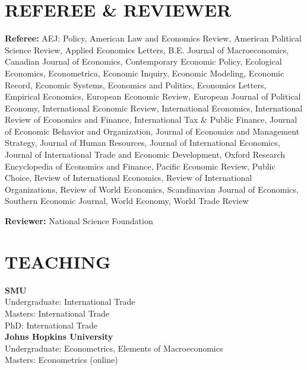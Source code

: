 \documentclass[11pt]{res}
\begin{document}
\begin{resume}
\section{REFEREE \& REVIEWER} \vspace{1.5mm}
{\bf Referee:} AEJ: Policy, American Law and Economics Review, American Political Science Review, Applied Economics Letters, B.E. Journal of Macroeconomics, Canadian Journal of Economics, Contemporary Economic Policy, Ecological Economics, Econometrica, Economic Inquiry, Economic Modeling, Economic Record, Economic Systems, Economics and Politics, Economics Letters, Empirical Economics, European Economic Review, European Journal of Political Economy, International Economic Review, International Economics, International Review of Economics and Finance, International Tax \& Public Finance, Journal of Economic Behavior and Organization, Journal of Economics and Management Strategy, Journal of Human Resources, Journal of International Economics, Journal of International Trade and Economic Development, Oxford Research Encyclopedia of Economics and Finance, Pacific Economic Review, Public Choice, Review of International Economics, Review of International Organizations, Review of World Economics, Scandinavian Journal of Economics, Southern Economic Journal, World Economy, World Trade Review

{\bf Reviewer:} National Science Foundation

\section{TEACHING} \vspace{1.5mm}
\textbf{SMU}\vspace{1.5mm}\\
Undergraduate: International Trade\vspace{1.5mm}\\
Masters: International Trade\vspace{1.5mm}\\
PhD: International Trade\vspace{4mm}\\
\textbf{Johns Hopkins University}\vspace{1.5mm}\\
Undergraduate: Econometrics, Elements of Macroeconomics\vspace{1.5mm}\\
Masters: Econometrics (online)


\end{resume}
\end{document}
